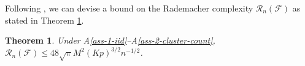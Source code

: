 \documentclass[11pt]{article}
\newtheorem{thm}{Theorem}[section]
\newtheorem{lemma}{Lemma}[section]
\newtheorem{defn}{Definition}
\begin{document}

Following \cite{paul2021uniform}, we can devise a bound on the Rademacher complexity $\mathcal{R}_n(\mathcal{F})$ as stated in Theorem \ref{thm-1-RnF}.

\begin{thm}\label{thm-1-RnF}
    Under A\ref{ass-1-iid}--A\ref{ass-2-cluster-count}, $\mathcal{R}_n(\mathcal{F})\le 48\sqrt{\pi}M^2(Kp)^{3/2}n^{-1/2}$.
\end{thm}

\end{document}
